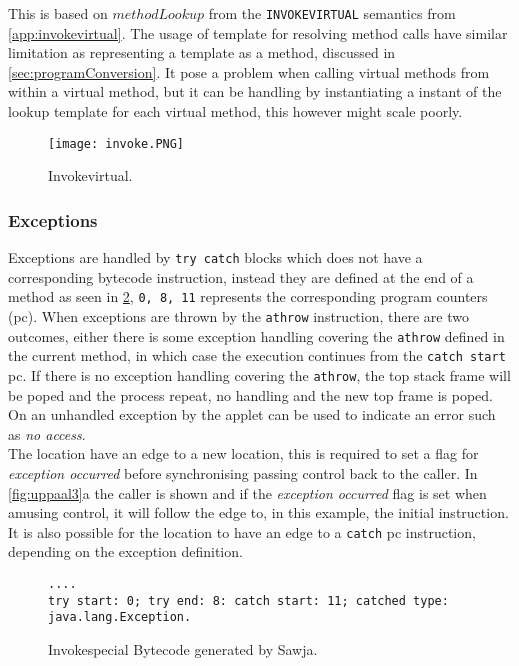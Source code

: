 This is based on $methodLookup$ from the \texttt{INVOKEVIRTUAL} semantics from \cref{app:invokevirtual}. The usage of template for resolving method calls have similar limitation as representing a template as a method, discussed in \cref{sec:programConversion}. It pose a problem when calling virtual methods from within a virtual method, but it can be handling by instantiating a instant of the lookup template for each virtual method, this however might scale poorly.

 
\begin{figure}[H]
\centering
\texttt{[image: invoke.PNG]}
\caption{Invokevirtual.}
\label{fig:invokevirtual}
\end{figure}

\subsubsection{Exceptions}
\label{sec:exceptions}
Exceptions are handled by \texttt{try catch} blocks which does not have a corresponding bytecode instruction, instead they are defined at the end of a method as seen in \cref{lst:exception}, \texttt{0, 8, 11} represents the corresponding program counters (pc).
When exceptions are thrown by the \texttt{athrow} instruction, there are two outcomes, either there is some exception handling covering the \texttt{athrow} defined in the current method, in which case the execution continues from the \texttt{catch start} pc. 
If there is no exception handling covering the \texttt{athrow}, the top stack frame will be poped and the process repeat, no handling and the new top frame is poped. On \jc an unhandled exception by the applet can be used to indicate an error such as \textit{no access}.\\

\noindent The  location have an edge to a new location, this is required to set a flag for \textit{exception occurred} before synchronising passing control back to the caller. In \cref{fig:uppaal3}a the caller is shown and if the \textit{exception occurred} flag is set when amusing control, it will follow the edge to, in this example, the initial instruction. It is also possible for the  location to have an edge to a \texttt{catch} pc instruction, depending on the exception definition.




\begin{figure}
  \begin{lstlisting}
....
try start: 0; try end: 8: catch start: 11; catched type: java.lang.Exception.
  \end{lstlisting}
  \caption{Invokespecial Bytecode generated by Sawja.}
  \label{lst:exception}
\end{figure}



